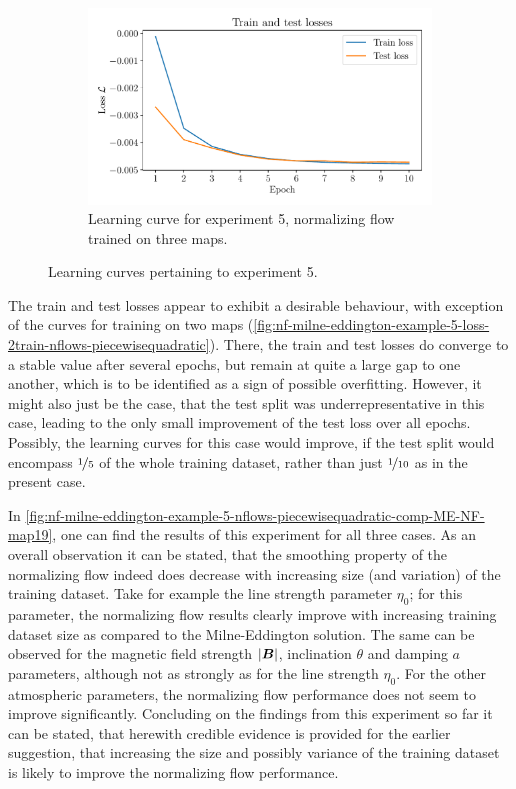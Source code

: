 \documentclass[a4paper,12pt]{report}
\begin{document}
\begin{figure}[h]
\hfill
\begin{subfigure}[t]{0.32\textwidth}
    \centering
    \includegraphics[width=\textwidth]{figures/nf-milne-eddington-example-5-loss-3train-nflows-piecewisequadratic.pdf}
    \caption{Learning curve for experiment 5, normalizing flow trained on three maps.}
    \label{fig:nf-milne-eddington-example-5-loss-3train-nflows-piecewisequadratic}
\end{subfigure}
\caption{Learning curves pertaining to experiment 5.}
\label{fig:nf-milne-eddington-example-5-loss-nflows-piecewisequadratic}
\end{figure}
The train and test losses appear to exhibit a desirable behaviour, with exception of the curves for training on two maps (\cref{fig:nf-milne-eddington-example-5-loss-2train-nflows-piecewisequadratic}). There, the train and test losses do converge to a stable value after several epochs, but remain at quite a large gap to one another, which is to be identified as a sign of possible overfitting. However, it might also just be the case, that the test split was underrepresentative in this case, leading to the only small improvement of the test loss over all epochs. Possibly, the learning curves for this case would improve, if the test split would encompass $\nicefrac{1}{5}$ of the whole training dataset, rather than just $\nicefrac{1}{10}$ as in the present case.

In \cref{fig:nf-milne-eddington-example-5-nflows-piecewisequadratic-comp-ME-NF-map19}, one can find the results of this experiment for all three cases. As an overall observation it can be stated, that the smoothing property of the normalizing flow indeed does decrease with increasing size (and variation) of the training dataset. Take for example the line strength parameter $\eta_0$; for this parameter, the normalizing flow results clearly improve with increasing training dataset size as compared to the Milne-Eddington solution. The same can be observed for the magnetic field strength $|\bm{B}|$, inclination $\theta$ and damping $a$ parameters, although not as strongly as for the line strength $\eta_0$. For the other atmospheric parameters, the normalizing flow performance does not seem to improve significantly. Concluding on the findings from this experiment so far it can be stated, that herewith credible evidence is provided for the earlier suggestion, that increasing the size and possibly variance of the training dataset is likely to improve the normalizing flow performance.
\end{document}
